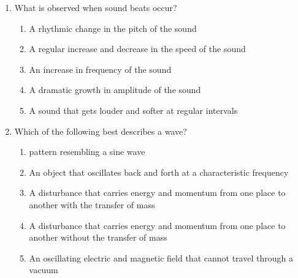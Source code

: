 \documentclass{../../../oss-apphys}
\begin{document}
\begin{multicols}{2}
\begin{enumerate}[leftmargin=18pt,resume]
  \item What is observed when sound beats occur?
    \begin{enumerate}[noitemsep,topsep=0pt,leftmargin=18pt,label=(\Alph*)]
    \item A rhythmic change in the pitch of the sound
    \item A regular increase and decrease in the speed of the sound
    \item An increase in frequency of the sound
    \item A dramatic growth in amplitude of the sound
    \item A sound that gets louder and softer at regular intervals
    \end{enumerate}
    
  \item Which of the following best describes a wave?
    \begin{enumerate}[noitemsep,topsep=0pt,leftmargin=18pt,label=(\Alph*)]
    \item pattern resembling a sine wave
    \item An object that oscillates back and forth at a characteristic frequency
    \item A disturbance that carries energy and momentum from one place to
      another with the transfer of mass
    \item A disturbance that carries energy and momentum from one place to
      another without the transfer of mass
    \item An oscillating electric and magnetic field that cannot travel through
      a vacuum
  \end{enumerate}
  
    \columnbreak
    

\end{enumerate}
\end{multicols}
\end{document}
